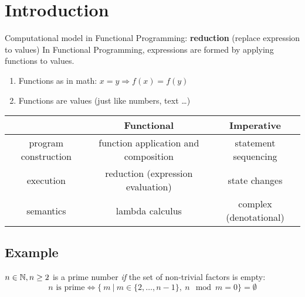 


\section{Introduction} %
\label{cha:introduction}

Computational model in Functional Programming: \textbf{reduction} (replace expression to values)
In Functional Programming, expressions are formed by applying functions to values.
\begin{enumerate}
    \item Functions as in math: $x = y \Rightarrow f(x) = f(y)$
    \item Functions are values (just like numbers, text \dots)
\end{enumerate}

\vspace{9pt}\begin{center}\begin{tabular}{|c|c|c|}\hline
\rowcolor{grau}                         & Functional                                & Imperative        \\\hline
                program construction    & function application and composition      & statement sequencing      \\\hline
                execution               & reduction (expression evaluation)         & state changes             \\\hline
                semantics               & lambda calculus                           & complex (denotational)    \\\hline
\end{tabular}\end{center}\vspace{9pt}

\subsection*{Example}
$n \in \mathbb{N}, n \ge 2 $ is a prime number \textit{if} the set of non-trivial factors is empty:\\
$$ n \text{ is prime} \Leftrightarrow \{\ m\ |\ m \in \{2,\dots, n-1\},\ n \mod m = 0 \} = \emptyset $$
\\

